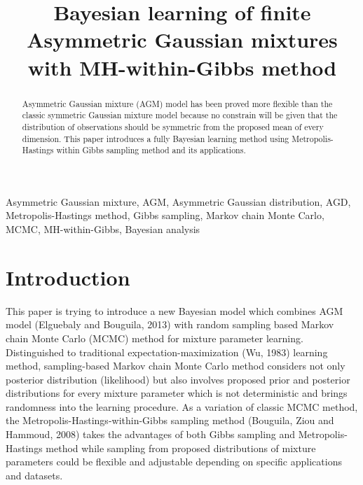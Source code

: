 \documentclass[conference]{IEEEtran}
\begin{document}
\title{Bayesian learning of finite Asymmetric Gaussian mixtures with MH-within-Gibbs method\\
}

\author{
\and
{}
}

\maketitle

\begin{abstract}
Asymmetric Gaussian mixture (AGM) model has been proved more flexible than the classic symmetric Gaussian mixture model because no constrain will be given that the distribution of observations should be symmetric from the proposed mean of every dimension. This paper introduces a fully Bayesian learning method using Metropolis-Hastings within Gibbs sampling method and its applications.
\end{abstract}

\begin{IEEEkeywords}
Asymmetric Gaussian mixture, AGM, Asymmetric Gaussian distribution, AGD, Metropolis-Hastings method, Gibbs sampling, Markov chain Monte Carlo, MCMC, MH-within-Gibbs, Bayesian analysis
\end{IEEEkeywords}

\section{Introduction}
This paper is trying to introduce a new Bayesian model which combines AGM model (Elguebaly and Bouguila, 2013) \cite{b1} with random sampling based Markov chain Monte Carlo (MCMC) method for mixture parameter learning. Distinguished to traditional expectation-maximization (Wu, 1983)\cite{b2} learning method, sampling-based Markov chain Monte Carlo method considers not only posterior distribution (likelihood) but also involves proposed prior and posterior distributions for every mixture parameter which is not deterministic and brings randomness into the learning procedure. As a variation of classic MCMC method, the Metropolis-Hastings-within-Gibbs sampling method (Bouguila, Ziou and Hammoud, 2008)\cite{b3} takes the advantages of both Gibbs sampling and Metropolis-Hastings method while sampling from proposed distributions of mixture parameters could be flexible and adjustable depending on specific applications and datasets. 
\end{document}

